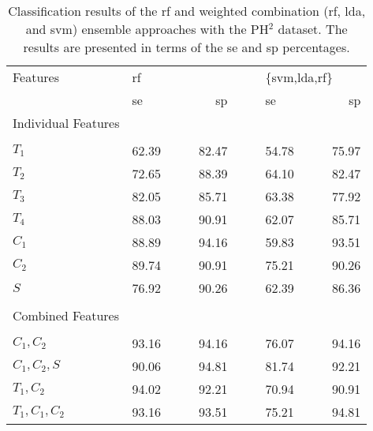 \begin{table}[t]
	\caption[Results of Experiment~\#3]{Classification results of the \ac{rf} and weighted combination (\ac{rf}, \ac{lda}, and \ac{svm}) ensemble approaches with the PH$^{2}$ dataset. %
	The results are presented in terms of the \ac{se} and \ac{sp} percentages.}
	\label{tab:globalmapExp3}
	\medskip
		
	\footnotesize{
	\begin{center}
	\begin{tabularx}{0.74\textwidth}{@{}l	lllr	 ll	lllr	 @{}}
	\toprule
	Features & \multicolumn{4}{l}{\ac{rf}} & & & \multicolumn{4}{l}{$\{$\ac{svm},\ac{lda},\ac{rf}$\}$} \\
	\cmidrule{2-5} \cmidrule{8-11} 
	& \ac{se} & & & \ac{sp} & & &  \ac{se} & & & \ac{sp} \\
	\cmidrule{2-11}
	Individual Features\\
	\multicolumn{11}{l}{}\\[-1ex]
 $T_1$ & 62.39	& & & 82.47 & & &  54.78 & & & 75.97\\
 $T_2$ & 72.65	& & & 88.39 & & &  64.10	 & & & 82.47\\
 $T_3$ & 82.05	& & & 85.71	& & &  63.38	 & & & 77.92\\
 $T_4$ & 88.03	& & & 90.91 & & &  62.07	 & & & 85.71\\
 $C_1$ & 88.89	& & & 94.16 	& & &  59.83	 & & & 93.51\\
 $C_2$ & 89.74	& & & 90.91	& & &  75.21	 & & & 90.26\\
  $S$  & 76.92	& & & 90.26	& & &  62.39	 & & & 86.36\\	
	\multicolumn{11}{l}{}\\
	Combined Features\\
	\multicolumn{11}{l}{}\\[-1ex]
$C_1,C_2	$					& \cellcolor[gray]{0.8}93.16 &\cellcolor[gray]{0.8} &\cellcolor[gray]{0.8} & \cellcolor[gray]{0.8}94.16 & & & 76.07 & & & 94.16\\
$C_1,C_2,S$					& 90.06 	& & & 94.81	& & & 81.74 & & & 92.21\\
$T_1,C_2$					& \cellcolor[gray]{0.8}94.02	&\cellcolor[gray]{0.8} &\cellcolor[gray]{0.8} & \cellcolor[gray]{0.8}92.21	& & & 70.94	& & & 90.91\\
$T_1,C_1,C_2$				& \cellcolor[gray]{0.8}93.16	&\cellcolor[gray]{0.8} &\cellcolor[gray]{0.8} & \cellcolor[gray]{0.8}93.51	& & & 75.21	& & & 94.81\\

\end{tabularx}
\end{center}}
\end{table}
